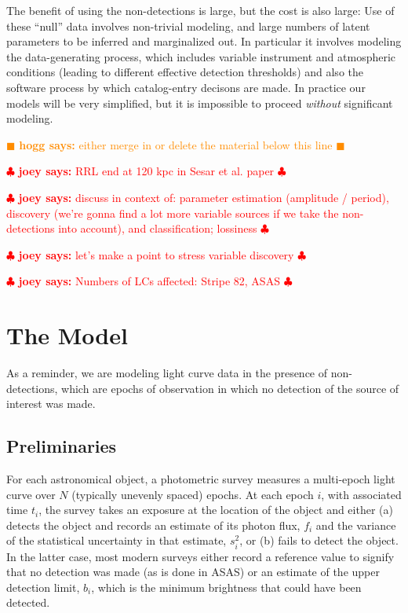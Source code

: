 \documentclass[12pt,preprint]{aastex}
\newcommand{\fobs}{f_i}
\newcommand{\sobs}{s^2_i}
\newcommand{\hogg}[1] { \textcolor{darkorange} {
\ensuremath{\blacksquare} {\bf hogg says:}  {#1}
\ensuremath{\blacksquare} } }
\newcommand{\joey}[1] { \textcolor{red} {
\ensuremath{\clubsuit} {\bf joey says:}  {#1}
\ensuremath{\clubsuit} } }%
\begin{document}
The benefit of using the non-detections is large, but the cost is also large:
Use of these ``null'' data involves non-trivial modeling,
and large numbers of latent parameters to be inferred and marginalized out.
In particular it involves modeling the data-generating process,
which includes variable instrument and atmospheric conditions
(leading to different effective detection thresholds)
and also the software process by which catalog-entry decisons are made.
In practice our models will be very simplified, but it is impossible to proceed \emph{without} significant modeling.

\hogg{either merge in or delete the material below this line}

\joey{RRL end at 120 kpc in Sesar et al. paper}

\joey{discuss in context of: parameter estimation (amplitude / period), discovery (we're gonna find a lot more variable sources if we take the non-detections into account), and classification; lossiness}

\joey{let's make a point to stress variable discovery}

\joey{Numbers of LCs affected: Stripe 82, ASAS}

\section{The Model}
\label{sec:model}

As a reminder, we are modeling light curve data in the presence of non-detections, which are epochs of observation in which no detection of the source of interest was made.

\subsection{Preliminaries}
\label{ss:prelim}

For each astronomical object, a photometric survey measures a multi-epoch light curve over $N$ (typically unevenly spaced) epochs.  At each epoch $i$, with associated time $t_i$, the survey takes an exposure at the location of the object and either (a) detects the object and records an estimate of its photon flux, $\fobs$ and the  variance of the statistical uncertainty in that estimate, $\sobs$, or (b) fails to detect the object.  In the latter case, most modern surveys either record a reference value to signify that no detection was made (as is done in ASAS) or an estimate of the upper detection limit, $b_i$, which is the minimum brightness that could have been detected.
\end{document}
